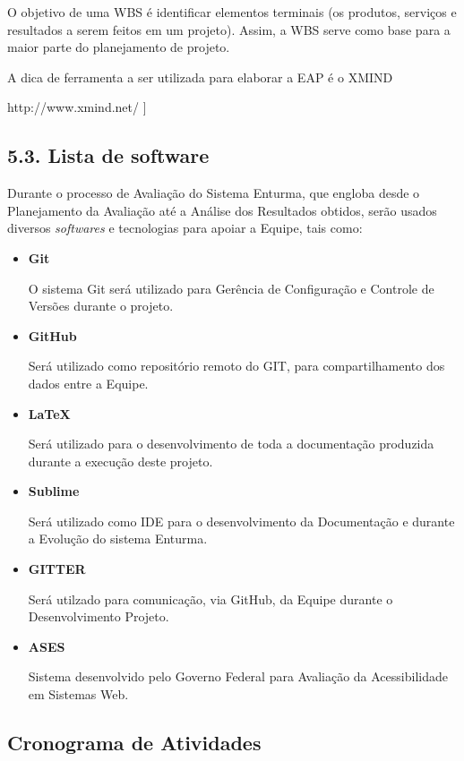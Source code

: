 	O objetivo de uma WBS é identificar elementos terminais (os produtos, serviços e resultados a serem feitos em um projeto). Assim, a WBS serve como base para a maior parte do planejamento de projeto.
	
	A dica de ferramenta a ser utilizada para elaborar a EAP é o XMIND 
	
	http://www.xmind.net/ ]

\subsection{5.3. Lista de software}
	
	Durante o processo de Avaliação do Sistema Enturma, que engloba desde o Planejamento da Avaliação até a Análise dos Resultados obtidos, serão usados diversos \textit{softwares} e tecnologias para apoiar a Equipe, tais como:

	\begin{itemize}
		\item \textbf{Git}

			O sistema Git será utilizado para Gerência de Configuração e Controle de Versões durante o projeto.

		\item \textbf{GitHub}
			
			Será utilizado como repositório remoto do GIT, para compartilhamento dos dados entre a Equipe.

		\item \textbf{LaTeX}

			Será utilizado para o desenvolvimento de toda a documentação produzida durante a execução deste projeto.

		\item \textbf{Sublime}

			Será utilizado como IDE para o desenvolvimento da Documentação e durante a Evolução do sistema Enturma.

		\item \textbf{GITTER}

			Será utilzado para comunicação, via GitHub, da Equipe durante o Desenvolvimento Projeto.

		\item \textbf{ASES}

			Sistema desenvolvido pelo Governo Federal para Avaliação da Acessibilidade em Sistemas Web.

	\end{itemize}

\subsection{Cronograma de Atividades}

